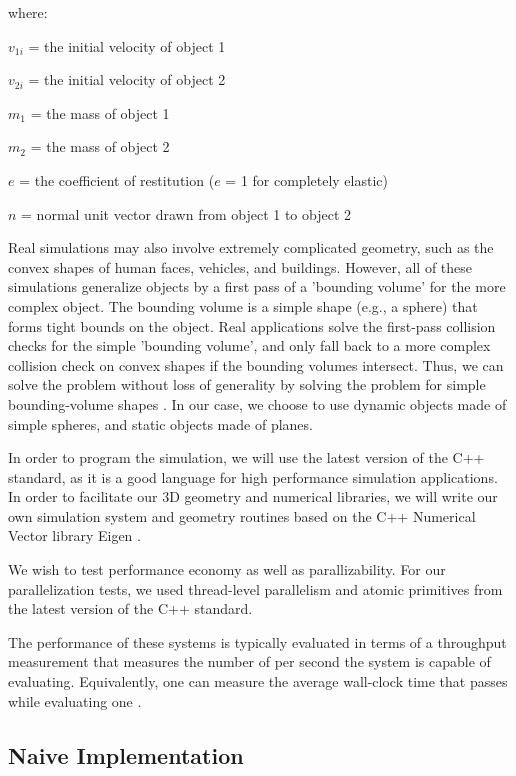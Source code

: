 \documentclass[CEJCS,PDF]{cej} %
\begin{document}
where:

$v_{1i}$ = the initial velocity of object 1

$v_{2i}$ = the initial velocity of object 2

$m_1$ = the mass of object 1

$m_2$ = the mass of object 2

$e$ = the coefficient of restitution ($e$ = 1 for completely elastic)

$n$ = normal unit vector drawn from object 1 to object 2


Real simulations may also involve extremely complicated geometry, such as the convex shapes of human faces, vehicles, and buildings.  However, 
all of these simulations generalize objects by a first pass of a 'bounding volume' for the more complex object.  The bounding volume is a simple shape (e.g., a sphere)
that forms tight bounds on the object.  Real applications solve the first-pass collision checks for the simple 'bounding volume', and only fall back to a more complex
collision check on convex shapes if the bounding volumes intersect.  Thus, we can solve the problem without loss of generality by solving the problem
for simple bounding-volume shapes \cite{uberflow,cloth}.  In our case, we choose to use dynamic objects made of simple spheres, and static objects made of planes.

In order to program the simulation, we will use the latest version of the C++ standard, as it is a good language for high performance simulation applications.  In order to facilitate our 
3D geometry and numerical libraries, we will write our own simulation system and geometry routines based on the C++ Numerical Vector library Eigen \cite{eigenweb}.  

We wish to test performance economy as well as parallizability.  For our parallelization tests, we used thread-level parallelism and atomic primitives from the latest version of the C++ standard.

The performance of these systems is typically evaluated in terms of a throughput measurement that measures the number of  per second the system is capable of evaluating.  Equivalently, one can measure the average wall-clock time that passes while evaluating one .

\subsection{Naive Implementation}
\end{document}
